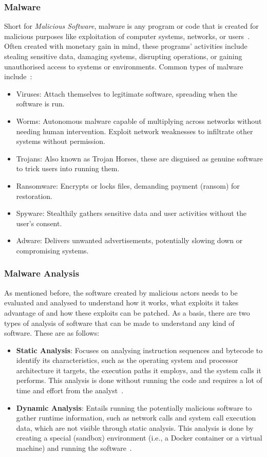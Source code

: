 \subsubsection{Malware}\label{subsubsec:Malware}
Short for \textit{Malicious Software}, \gls{malware} is any program or code that is created for
malicious purposes like exploitation of computer systems, networks, or
users~\cite{patil2014computer}. Often created with monetary gain in mind, these programs’
activities include stealing sensitive data, damaging systems, disrupting operations, or gaining
unauthorised access to systems or environments. Common types of malware
include~\cite{berrios2025malware,abrazak2016rise,mat2021systematic}:
\begin{itemize}
	\item Viruses: Attach themselves to legitimate software, spreading when the software is run.
	\item Worms: Autonomous malware capable of multiplying across networks without needing human
	      intervention. Exploit network weaknesses to infiltrate other systems without permission.
	\item Trojans: Also known as Trojan Horses, these are disguised as genuine software to trick users into
	      running them.
	\item Ransomware: Encrypts or locks files, demanding payment (ransom) for restoration.
	\item Spyware: Stealthily gathers sensitive data and user activities without the user’s consent.
	\item Adware: Delivers unwanted advertisements, potentially slowing down or compromising systems.
\end{itemize}

\subsubsection{Malware Analysis}\label{subsubsec:MalwareAnalysis}
As mentioned before, the software created by malicious actors needs to be evaluated and analysed to
understand how it works, what exploits it takes advantage of and how these exploits can be patched.
As a basis, there are two types of analysis of software that can be made to understand any kind of
software. These are as follows:
\begin{itemize}
	\item \textbf{Static Analysis}: Focuses on analysing instruction sequences and bytecode to identify its characteristics,
	      such as the operating system and processor architecture it targets, the execution paths it employs, and the system calls it performs.
	      This analysis is done without running the code and requires a lot of time and effort from the analyst~\cite{fedak2020fundamentals}.
	\item \textbf{Dynamic Analysis}: Entails running the potentially malicious software to gather runtime information,
	      such as network calls and system call execution data, which are not visible through static analysis.
	      This analysis is done by creating a special (sandbox) environment (i.e., a Docker container or a virtual
	      machine) and running the software~\cite{ormeir2019dynamic}.
\end{itemize}

